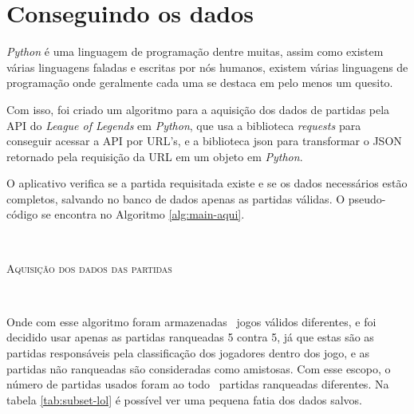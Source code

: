 \section{Conseguindo os dados}
\label{section:get}
\textit{Python} é uma linguagem de programação dentre muitas, assim como existem várias linguagens faladas e escritas por nós humanos, existem várias linguagens de programação onde geralmente cada uma se destaca em pelo menos um quesito. 

Com isso, foi criado um algoritmo para a aquisição dos dados de partidas pela API do \textit{League of Legends} em \textit{Python}, que usa a biblioteca \textit{requests} para conseguir acessar a API por URL's, e a biblioteca json para transformar o JSON retornado pela requisição da URL em um objeto em \textit{Python}.

O aplicativo verifica se a partida requisitada existe e se os dados necessários estão completos, salvando no banco de dados apenas as partidas válidas. O pseudo-código se encontra no Algoritmo \ref{alg:main-aqui}.

\


\begin{algorithm}[H]
   \SetAlgoLined
   \label{alg:main-aqui}
   \caption{\textsc{Aquisição dos dados das partidas}}
 \end{algorithm}

\

Onde com esse algoritmo foram armazenadas \numpartidas\ jogos válidos diferentes, e foi decidido usar apenas as partidas ranqueadas 5 contra 5, já que estas são as partidas responsáveis pela classificação dos jogadores dentro dos jogo, e as partidas não ranqueadas são consideradas como amistosas.
Com esse escopo, o número de partidas usados foram ao todo \partidasrankeds\ partidas ranqueadas diferentes.
Na tabela \ref{tab:subset-lol} é possível ver uma pequena fatia dos dados salvos.


